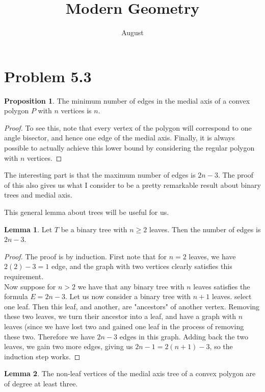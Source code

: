 \documentclass[12pt]{article}
\title{Modern Geometry}
\author{August}
\theoremstyle{definition}
\newtheorem{lemma}{Lemma}
\newtheorem{proposition}{Proposition}
\begin{document}
\maketitle

\section{Problem 5.3}


\begin{proposition}
The minimum number of edges in the medial axis of a convex polygon $P$ with $n$ vertices is $n$.
\end{proposition}
\begin{proof}
To see this, note that every vertex of the polygon will correspond to one angle bisector, and hence one edge of the medial axis. Finally, it is always possible to actually achieve this lower bound by considering the regular polygon with $n$ vertices. 
\end{proof}

The interesting part is that the maximum number of edges is $2n-3$. The proof of this also gives us what I consider to be a pretty remarkable result about binary trees and medial axis.

This general lemma about trees will be useful for us.
\begin{lemma}
Let $T$ be a binary tree with $n\ge 2$ leaves. Then the number of edges is $2n-3$. 
\end{lemma}

\begin{proof} The proof is by induction. First note that for $n = 2$ leaves, we have $2(2) - 3 = 1$ edge, and the graph with two vertices clearly satisfies this requirement.\\

Now suppose for $n > 2$ we have that any binary tree with $n$ leaves satisfies the formula $E = 2n-3$. Let us now consider a binary tree with $n+1$ leaves. select one leaf. Then this leaf, and another, are "ancestors" of another vertex. Removing these two leaves, we turn their ancestor into a leaf, and have a graph with $n$ leaves (since we have lost two and gained one leaf in the process of removing these two. Therefore we have $2n-3$ edges in this graph. Adding back the two leaves, we gain two more edges, giving us $2n-1 = 2(n+1) - 3$, so the induction step works.
\end{proof}

\begin{lemma}
The non-leaf vertices of the medial axis tree of a convex polygon are of degree at least three.
\end{lemma}
\end{document}
